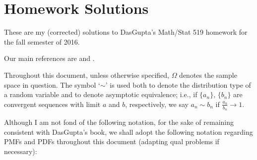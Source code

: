 \section{Homework Solutions}
These are my (corrected) solutions to DasGupta's Math/Stat 519 homework for
the fall semester of 2016.

Our main references are \cite{dasgupta} and \cite{feller}.

Throughout this document, unless otherwise specified, \(\Omega\) denotes
the sample space in question. The symbol `\(\sim\)' is used both to denote
the distribution type of a random variable and to denote asymptotic
equivalence; i.e., if \(\{a_n\}\), \(\{b_n\}\) are convergent sequences
with limit \(a\) and \(b\), respectively, we say \(a_n\sim b_n\) if
\(\frac{a_n}{b_n}\to 1\).

Although I am not fond of the following notation, for the sake of remaining
consistent with DasGupta's book, we shall adopt the following notation
regarding PMFs and PDFs throughout this document (adapting qual problems if
necessary):

